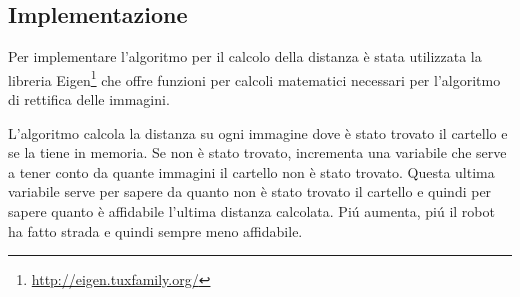 	\subsection{Implementazione}
		Per implementare l'algoritmo per il calcolo della distanza è stata utilizzata la libreria Eigen\footnote{\url{ http://eigen.tuxfamily.org/}} che offre funzioni per calcoli matematici necessari per l'algoritmo di rettifica delle immagini.

		L'algoritmo calcola la distanza su ogni immagine dove è stato trovato il cartello e se la tiene in memoria. Se non è stato trovato, incrementa una variabile che serve a tener conto da quante immagini il cartello non è stato trovato. Questa ultima variabile serve per sapere da quanto non è stato trovato il cartello e quindi per sapere quanto è affidabile l'ultima distanza calcolata. Pi\'u aumenta, pi\'u il robot ha fatto strada e quindi sempre meno affidabile.

